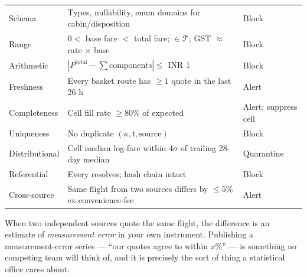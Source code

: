 \begin{center}
\footnotesize
\begin{tabularx}{\textwidth}{@{}L{3.4cm} X L{2.2cm}@{}}
\toprule
{} &  &  \\
\midrule
Schema & Types, nullability, enum domains for cabin/disposition & Block \\
Range & $0 <$ base fare $<$ total fare;  $\in\mathcal{T}$; GST $\approx$ rate $\times$ base & Block \\
Arithmetic & $|P^{\text{total}} - \sum \text{components}| \le$ INR 1 & Block \\
Freshness & Every basket route has $\ge 1$ quote in the last 26 h & Alert \\
Completeness & Cell fill rate $\ge 80\%$ of expected & Alert; suppress cell \\
Uniqueness & No duplicate $(\kappa, t, \text{source})$ & Block \\
Distributional & Cell median log-fare within $4\sigma$ of trailing 28-day median & Quarantine \\
Referential & Every  resolves; hash chain intact & Block \\
Cross-source & Same flight from two sources differs by $\le 5\%$ ex-convenience-fee & Alert \\
\bottomrule
\end{tabularx}
\end{center}

\begin{keybox}
 When two independent sources quote the same
flight, the difference is an estimate of \emph{measurement error} in your own instrument.
Publishing a measurement-error series --- ``our quotes agree to within $x\%$'' --- is
something no competing team will think of, and it is precisely the sort of thing a
statistical office cares about.
\end{keybox}
